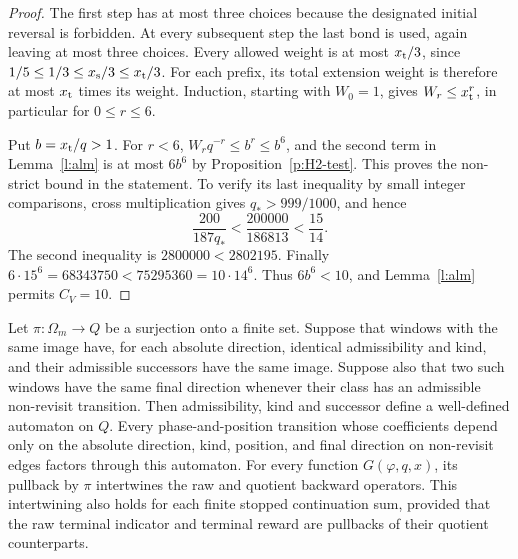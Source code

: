 \begin{proof}
The first step has at most three choices because the designated
initial reversal is forbidden. At every subsequent step the last
bond is used, again leaving at most three choices. Every allowed
weight is at most \(x_{\rm t}/3\), since
\(1/5\le1/3\le x_{\rm s}/3\le x_{\rm t}/3\).
For each prefix, its total extension weight is therefore at most
\(x_{\rm t}\) times its weight. Induction, starting with \(W_0=1\),
gives \(W_r\le x_{\rm t}^r\), in particular for \(0\le r\le6\).

Put \(b=x_{\rm t}/q>1\). For \(r<6\),
\(W_rq^{-r}\le b^r\le b^6\), and the second term in
Lemma~\ref{l:alm} is at most \(6b^6\) by
Proposition~\ref{p:H2-test}. This proves the non-strict bound
in the statement. To verify its last inequality by small integer
comparisons, cross multiplication gives
\(q_*>999/1000\), and hence
\[
 \frac{200}{187q_*}<\frac{200000}{186813}<\frac{15}{14}.
\]
The second inequality is \(2800000<2802195\).
Finally
\(6\cdot15^6=68343750<75295360=10\cdot14^6\).
Thus \(6b^6<10\), and Lemma~\ref{l:alm} permits \(C_V=10\).
\end{proof}

\begin{lemma}\label{l:automaton-quotient}
Let \(\pi:\Omega_m\to Q\) be a surjection onto a finite set.
Suppose that windows with the same image have, for each absolute
direction, identical admissibility and kind, and their admissible
successors have the same image. Suppose also that two such windows
have the same final direction whenever their class has an admissible
non-revisit transition.
Then admissibility, kind and successor define a well-defined automaton
on \(Q\). Every phase-and-position transition whose coefficients
depend only on the absolute direction, kind, position, and final
direction on non-revisit edges factors through this automaton.
For every function \(G(\varphi,q,x)\), its pullback by \(\pi\)
intertwines the raw and quotient backward operators. This
intertwining also holds for each finite stopped continuation sum,
provided that the raw terminal indicator and terminal reward are
pullbacks of their quotient counterparts.
\end{lemma}

